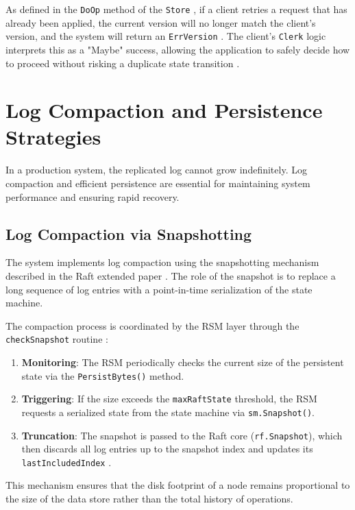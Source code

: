 As defined in the \texttt{DoOp} method of the \texttt{Store} \cite{store_go}, if a client retries a request that has already been applied, the current version will no longer match the client's version, and the system will return an \texttt{ErrVersion} \cite{api_go}. The client's \texttt{Clerk} logic interprets this as a "Maybe" success, allowing the application to safely decide how to proceed without risking a duplicate state transition \cite{clerk_go}.

\section{Log Compaction and Persistence Strategies}
\label{sec:persistence_strategies}
In a production system, the replicated log cannot grow indefinitely. Log compaction and efficient persistence are essential for maintaining system performance and ensuring rapid recovery.

\subsection{Log Compaction via Snapshotting}
The system implements log compaction using the snapshotting mechanism described in the Raft extended paper \cite{RaftExtended}. The role of the snapshot is to replace a long sequence of log entries with a point-in-time serialization of the state machine.

The compaction process is coordinated by the RSM layer through the \texttt{checkSnapshot} routine \cite{rsm_go}:
\begin{enumerate}
    \item \textbf{Monitoring}: The RSM periodically checks the current size of the persistent state via the \texttt{PersistBytes()} method.
    \item \textbf{Triggering}: If the size exceeds the \texttt{maxRaftState} threshold, the RSM requests a serialized state from the state machine via \texttt{sm.Snapshot()}.
    \item \textbf{Truncation}: The snapshot is passed to the Raft core (\texttt{rf.Snapshot}), which then discards all log entries up to the snapshot index and updates its \texttt{lastIncludedIndex} \cite{raft_go}.
\end{enumerate}



This mechanism ensures that the disk footprint of a node remains proportional to the size of the data store rather than the total history of operations.

